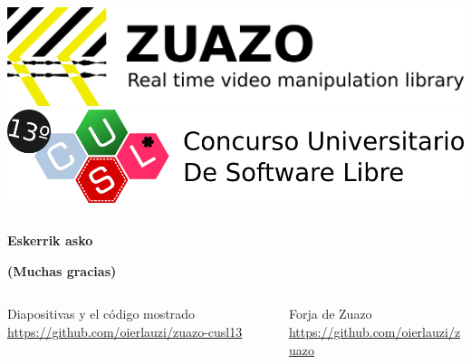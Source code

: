 \documentclass{beamer}
\begin{document}
\begin{frame}[plain]
	\begin{columns}
		 \includegraphics[width=\textwidth]{zuazo_logo}
		 \includegraphics[width=\textwidth]{cusl13_logo}
	\end{columns}
	\bigskip\bigskip
	\begin{center} \bf\color{blue}\Huge
		Eskerrik asko
	\end{center}
	\begin{center} \bf\color{blue}\Huge
		(Muchas gracias)
	\end{center}
	\bigskip\bigskip
	\begin{columns}
		\begin{column}{0.48\textwidth}
			\begin{block}{\footnotesize Diapositivas y el código mostrado}
				\tiny\url{https://github.com/oierlauzi/zuazo-cusl13}
			\end{block}
		\end{column}
		\begin{column}{0.48\textwidth}
			\begin{block}{\footnotesize Forja de Zuazo}
				\tiny\url{https://github.com/oierlauzi/zuazo}
			\end{block}
		\end{column}
	\end{columns}
\end{frame}

\end{document}
